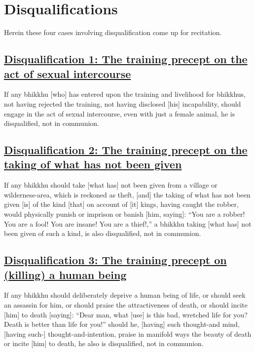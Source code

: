 
\section{Disqualifications}
\label{disqualifications}

\begin{intro}
	Herein these four cases involving disqualification come up for recitation.
\end{intro}

\setsubsecheadstyle{\subsubsectionFmtalt}
\subsection*{\hyperref[par1]{Disqualification 1: The training precept on the act of sexual intercourse}}
\label{disq1}

If any bhikkhu [who] has entered upon the training and livelihood for bhikkhus, not having rejected the training, not having disclosed [his] incapability, should engage in the act of sexual intercourse, even with just a female animal, he is disqualified, not in communion.



\subsection*{\hyperref[par2]{Disqualification 2: The training precept on the taking of what has not been given}}
\label{disq2}

If any bhikkhu should take [what has] not been given from a village or wilderness-area, which is reckoned as theft, [and] the taking of what has not been given [is] of the kind [that] on account of [it] kings, having caught the robber, would physically punish or imprison or banish [him, saying]: ``You are a robber! You are a fool! You are insane! You are a thief!,'' a bhikkhu taking [what has] not been given of such a kind, is also disqualified, not in communion.



\subsection*{\hyperref[par3]{Disqualification 3: The training precept on (killing) a human being}}
\label{disq3}

If any bhikkhu should deliberately deprive a human being of life, or should seek an assassin for him, or should praise the attractiveness of death, or should incite [him] to death [saying]: ``Dear man, what [use] is this bad, wretched life for you? Death is better than life for you!'' should he, [having] such thought-and mind, [having such-] thought-and-intention, praise in manifold ways the beauty of death or incite [him] to death, he also is disqualified, not in communion.



